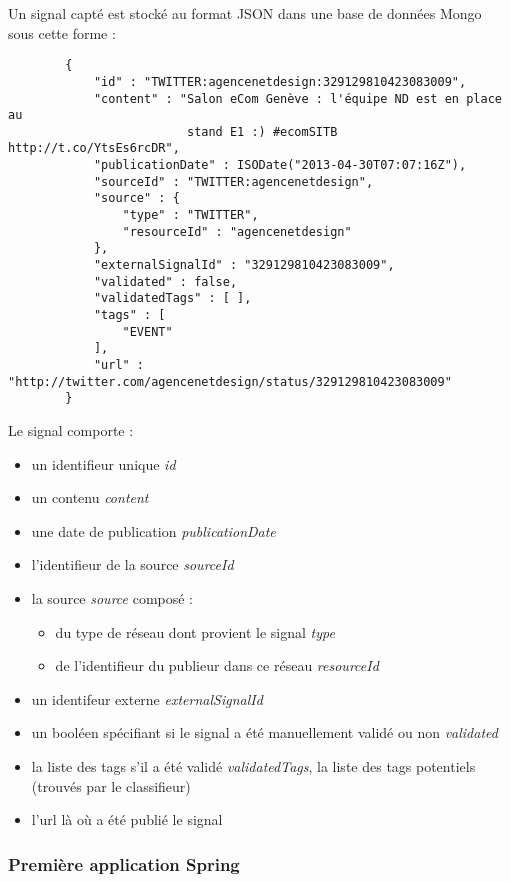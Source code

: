         Un signal capté est stocké au format JSON dans une base de données Mongo sous cette forme :
        \begin{verbatim}
        {
            "id" : "TWITTER:agencenetdesign:329129810423083009",
            "content" : "Salon eCom Genève : l'équipe ND est en place au
                         stand E1 :) #ecomSITB http://t.co/YtsEs6rcDR",
            "publicationDate" : ISODate("2013-04-30T07:07:16Z"),
            "sourceId" : "TWITTER:agencenetdesign",
            "source" : {
                "type" : "TWITTER",
                "resourceId" : "agencenetdesign"
            },
            "externalSignalId" : "329129810423083009",
            "validated" : false,
            "validatedTags" : [ ],
            "tags" : [
                "EVENT"
            ],
            "url" : "http://twitter.com/agencenetdesign/status/329129810423083009"
        }
        \end{verbatim}
        Le signal comporte :
        \begin{itemize}
            \item un identifieur unique \textit{id}
            \item un contenu \textit{content}
            \item une date de publication \textit{publicationDate}
            \item l'identifieur de la source \textit{sourceId}
            \item la source \textit{source} composé :
            \begin{itemize}
                \item du type de réseau dont provient le signal \textit{type}
                \item de l'identifieur du publieur dans ce réseau \textit{resourceId}
            \end{itemize}
            \item un identifeur externe \textit{externalSignalId}
            \item un booléen spécifiant si le signal a été manuellement validé ou non \textit{validated}
            \item la liste des tags s'il a été validé \textit{validatedTags}, la liste des tags potentiels (trouvés par le classifieur)
            \item l'url là où a été publié le signal
        \end{itemize}


        \subsubsection{Première application Spring}
